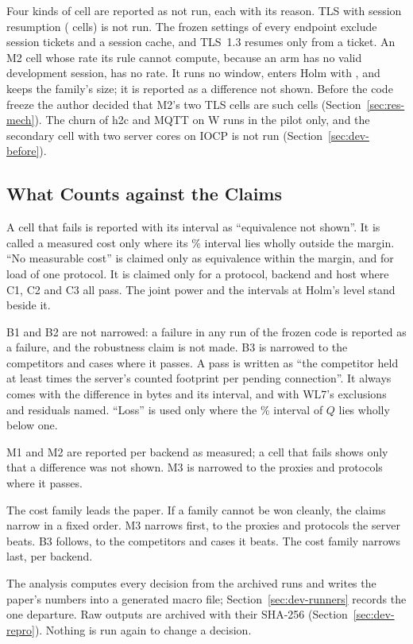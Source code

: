 Four kinds of cell are reported as not run, each with its reason. TLS with session resumption
(\ResumptionCells{} cells) is not run. The frozen settings of every endpoint exclude session tickets
and a session cache, and TLS~1.3 resumes only from a ticket. An M2 cell whose rate its
rule cannot compute, because an arm has no valid development session, has no rate. It runs no
window, enters Holm with \PIsOne{}, and keeps the family's size; it is reported as a difference not
shown. Before the code freeze the author decided that M2's two TLS cells are such cells
(Section~\ref{sec:res-mech}). The churn of h2c and MQTT on W runs in the pilot only, and the
secondary cell with two server cores on IOCP is not run (Section~\ref{sec:dev-before}).

\subsection{What Counts against the Claims}\label{sec:against}

 A cell that fails is reported with its interval as ``equivalence not shown''. It is
called a measured cost only where its \CiPct\% interval lies wholly outside the margin. ``No
measurable cost'' is claimed only as equivalence within the margin, and for load of one protocol.
It is claimed only for a protocol, backend and host where C1, C2 and C3 all pass. The joint power
and the intervals at Holm's level stand beside it.

 B1 and B2 are not narrowed: a failure in any run of the frozen code is reported
as a failure, and the robustness claim is not made. B3 is narrowed to the competitors and cases
where it passes. A pass is written as ``the competitor held at least \FootprintMargin{} times the
server's counted footprint per pending connection''. It always comes with the difference in bytes
and its interval, and with WL7's exclusions and residuals named. ``Loss'' is used only where the \CiPct\%
interval of $Q$ lies wholly below one.

 M1 and M2 are reported per backend as measured; a cell that fails shows only
that a difference was not shown. M3 is narrowed to the proxies and protocols where it passes.

 The cost family leads the paper. If a family cannot be won cleanly, the
claims narrow in a fixed order. M3 narrows first, to the proxies and protocols the server beats.
B3 follows, to the competitors and cases it beats. The cost family narrows last, per backend.

 The analysis computes every decision from the archived runs and writes the
paper's numbers into a generated macro file; Section~\ref{sec:dev-runners} records the one
departure. Raw outputs are archived with their SHA-256 (Section~\ref{sec:dev-repro}). Nothing is
run again to change a decision.
